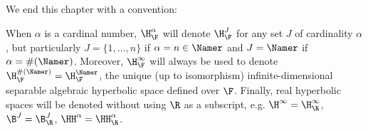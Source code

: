 We end this chapter with a convention:

\begin{convention}
\label{conventionH}
When $\alpha$ is a cardinal number, $\H_\F^\alpha$ will denote $\H_\F^J$ for any set $J$ of cardinality $\alpha$, but particularly $J = \{1,\ldots,n\}$ if $\alpha = n\in\Namer$ and $J = \Namer$ if $\alpha = \#(\Namer)$. Moreover, $\H_\F^\infty$ will always be used to denote $\H_\F^{\#(\Namer)} = \H_\F^{\Namer}$, the unique (up to isomorphism) infinite-dimensional separable algebraic hyperbolic space defined over $\F$. Finally, real hyperbolic spaces will be denoted without using $\R$ as a subscript, e.g. $\H^\infty = \H_\R^\infty$, $\B^J = \B_\R^J$, $\HH^\alpha = \HH_\R^\alpha$.
\end{convention}



